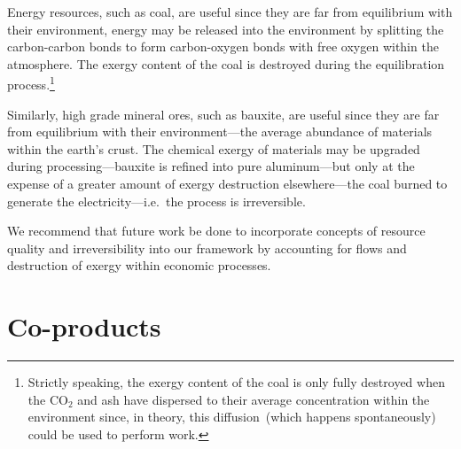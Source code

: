 

Energy resources, such as coal, are useful
since they are far from equilibrium with their environment,
energy may be released into the environment by
splitting the carbon-carbon bonds to form 
carbon-oxygen bonds with free oxygen 
within the atmosphere.
The exergy content of the coal is destroyed during
the equilibration process.\footnote{Strictly speaking,
the exergy content of the coal is only fully destroyed
when the CO$_2$ and ash have dispersed to their average
concentration within the environment since,
in theory,
this diffusion~(which happens spontaneously) 
could be used to perform work.}

Similarly, high grade mineral ores, such as bauxite, 
are useful since they are far from equilibrium with their
environment---the average abundance of materials
within the earth's crust.
The chemical exergy of materials may be upgraded
during processing---bauxite is refined into pure 
aluminum---but only at the expense of a greater
amount of exergy destruction elsewhere---the coal
burned to generate the electricity---i.e.\ the process is irreversible.

\vspace{5 mm}

We recommend that future work be done to incorporate 
concepts of resource quality and irreversibility 
into our framework by accounting for flows and
destruction of exergy within economic processes.


\section{Co-products}
\label{sec:make-use}

